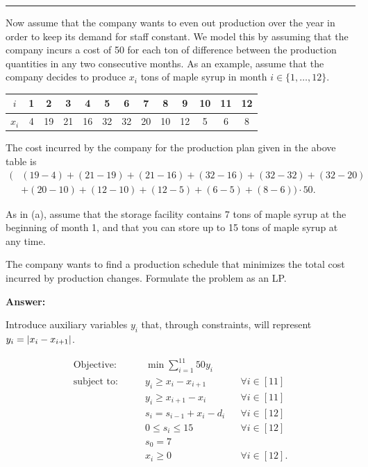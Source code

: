 \documentclass[11pt]{article}
\newcounter{problem}
\newenvironment{problem}{%
    \refstepcounter{problem}%
    \Needspace{7\baselineskip}%
    \par\vspace{0.7em}%
    \noindent\textcolor{courseblue}{\rule{\textwidth}{0.4pt}}%
    \par\vspace{0.5em}%
    \begin{list}{}{%
        \setlength{\leftmargin}{2.3em}%
        \setlength{\labelwidth}{1.8em}%
        \setlength{\labelsep}{0.5em}%
        \setlength{\topsep}{0pt}%
        \setlength{\partopsep}{0pt}%
    }%
    \item[{[\theproblem]}]
}{%
    \end{list}
    \par\vspace{0.5em}
}
\newenvironment{parts}{%
    \begin{enumerate}[label={[\alph*]},leftmargin=2.2em,itemsep=0.65em,topsep=0.65em]
}{%
    \end{enumerate}
}
\newenvironment{answer}{%
    \Needspace{4\baselineskip}%
    \par\vspace{0.35em}
    \noindent\textbf{Answer:}\par
}{%
    \par\vspace{0.25em}
}
\begin{document}
\begin{problem}
\begin{parts}
        \item Now assume that the company wants to even out production over the year in order to
        keep its demand for staff constant. We model this by assuming that the company incurs
        a cost of 50 for each ton of difference between the production quantities in any two
        consecutive months. As an example, assume that the company decides to produce $x_i$
        tons of maple syrup in month $i\in\{1,\ldots,12\}$.
        
        \begin{center}
        \begin{tabular}{c|*{12}{c}}
        \toprule
        $i$ & 1 & 2 & 3 & 4 & 5 & 6 & 7 & 8 & 9 & 10 & 11 & 12 \\
        \midrule
        $x_i$ & 4 & 19 & 21 & 16 & 32 & 32 & 20 & 10 & 12 & 5 & 6 & 8 \\
        \bottomrule
        \end{tabular}
        \end{center}
        
        The cost incurred by the company for the production plan given in the above table is
        \[
        \begin{aligned}
        \bigl(
        &(19-4)+(21-19)+(21-16)+(32-16)+(32-32)+(32-20)\\
        &+(20-10)+(12-10)+(12-5)+(6-5)+(8-6)
        \bigr)\cdot 50.
        \end{aligned}
        \]
        
        As in (a), assume that the storage facility contains 7 tons of maple syrup at the beginning
        of month 1, and that you can store up to 15 tons of maple syrup at any time.
        
        The company wants to find a production schedule that minimizes the total cost incurred
        by production changes. Formulate the problem as an LP.
        
        \begin{answer}
            Introduce auxiliary variables $y_i$ that, through constraints, will represent $y_i = \abs{x_i - x_{i+1}}$.

            \begin{align*}
                \text{Objective:}\qquad
                    & \min \sum_{i=1}^{11} 50y_i \\
                \text{subject to:}\qquad
                    & y_i \geq x_i - x_{i+1} && \forall i\in [11] \\
                    & y_i \geq x_{i+1} - x_i && \forall i\in [11] \\
                    & s_i = s_{i-1} + x_i - d_i && \forall i\in [12] \\
                    & 0 \leq s_i \leq 15 && \forall i\in [12]\\
                    & s_0 = 7 \\
                    & x_i \geq 0 && \forall i\in [12].
            \end{align*}
        \end{answer}
    \end{parts}
\end{problem}
\end{document}
